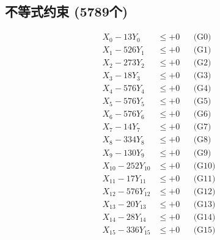 \documentclass[a4paper,10pt]{article}
\begin{document}
\subsection{不等式约束 (5789个)}

\allowdisplaybreaks
{\small
\begin{align}
\allowbreak
\allowbreak
\allowbreak
\allowbreak
\allowbreak
\allowbreak
\allowbreak
\allowbreak
\allowbreak
\allowbreak
\allowbreak
\allowbreak
\allowbreak
\allowbreak
\allowbreak
\allowbreak
\allowbreak
\allowbreak
\allowbreak
\allowbreak
\allowbreak
\allowbreak
\allowbreak
\allowbreak
\allowbreak
\allowbreak
\allowbreak
\allowbreak
\allowbreak
\allowbreak
\allowbreak
\allowbreak
\allowbreak
\allowbreak
\allowbreak
\allowbreak
\allowbreak
\allowbreak
\allowbreak
\allowbreak
\allowbreak
\allowbreak
\allowbreak
\allowbreak
\allowbreak
\allowbreak
\allowbreak
\allowbreak
\allowbreak
\allowbreak
\allowbreak
\allowbreak
\allowbreak
\allowbreak
\allowbreak
\allowbreak
\allowbreak
\allowbreak
\allowbreak
\allowbreak
\allowbreak
\allowbreak
\allowbreak
\allowbreak
\allowbreak
\allowbreak
\allowbreak
\allowbreak
\allowbreak
\allowbreak
\allowbreak
\allowbreak
\allowbreak
\allowbreak
\allowbreak
\allowbreak
\allowbreak
\allowbreak
X_{0} - 13Y_{0} &\leq +0 && \text{(G0)} \\
\allowbreak
X_{1} - 526Y_{1} &\leq +0 && \text{(G1)} \\
X_{2} - 273Y_{2} &\leq +0 && \text{(G2)} \\
X_{3} - 18Y_{3} &\leq +0 && \text{(G3)} \\
X_{4} - 576Y_{4} &\leq +0 && \text{(G4)} \\
X_{5} - 576Y_{5} &\leq +0 && \text{(G5)} \\
X_{6} - 576Y_{6} &\leq +0 && \text{(G6)} \\
X_{7} - 14Y_{7} &\leq +0 && \text{(G7)} \\
X_{8} - 334Y_{8} &\leq +0 && \text{(G8)} \\
X_{9} - 130Y_{9} &\leq +0 && \text{(G9)} \\
X_{10} - 252Y_{10} &\leq +0 && \text{(G10)} \\
\allowbreak
X_{11} - 17Y_{11} &\leq +0 && \text{(G11)} \\
X_{12} - 576Y_{12} &\leq +0 && \text{(G12)} \\
X_{13} - 20Y_{13} &\leq +0 && \text{(G13)} \\
X_{14} - 28Y_{14} &\leq +0 && \text{(G14)} \\
X_{15} - 336Y_{15} &\leq +0 && \text{(G15)} \\

\end{align}}
\end{document}
